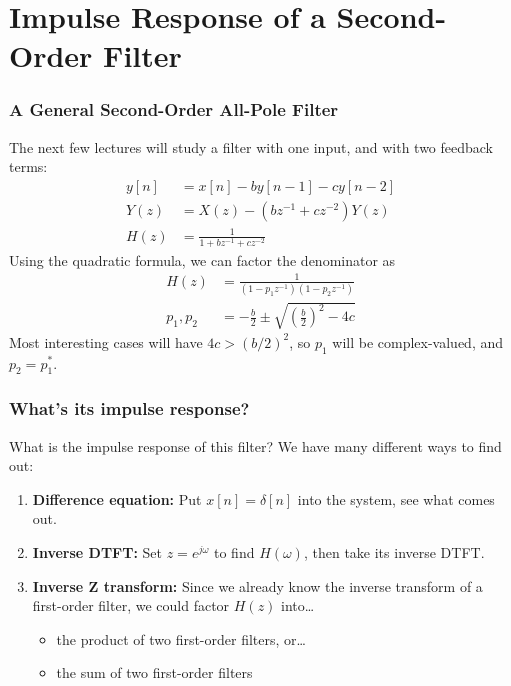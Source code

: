 \documentclass{beamer}
\begin{document}
\section[Second-Order]{Impulse Response of a Second-Order Filter}
\setcounter{subsection}{1}

\begin{frame}
  \frametitle{A General Second-Order All-Pole Filter}

  The next few lectures will study a filter with one input, and with
  two feedback terms:
  \begin{align*}
    y[n] &= x[n]-by[n-1]-cy[n-2]\\
    Y(z) &= X(z)-(bz^{-1}+cz^{-2})Y(z)\\
    H(z) &= \frac{1}{1+bz^{-1}+cz^{-2}}
  \end{align*}
  Using the quadratic formula, we can factor the denominator as
  \begin{align*}
    H(z) &= \frac{1}{(1-p_1z^{-1})(1-p_2z^{-1})}\\
    p_1,p_2 &= -\frac{b}{2}\pm\sqrt{\left(\frac{b}{2}\right)^2-4c}
  \end{align*}
  Most interesting cases will have $4c>(b/2)^2$, so $p_1$ will be
  complex-valued, and $p_2=p_1^*$.
\end{frame}

\begin{frame}
  \frametitle{What's its impulse response?}

  What is the impulse response of this filter?  We have many different
  ways to find out:
  \begin{enumerate}
  \item \textbf{Difference equation:} Put $x[n]=\delta[n]$
    into the system, see what comes out.
  \item \textbf{Inverse DTFT:} Set $z=e^{j\omega}$ to find
    $H(\omega)$, then take its inverse DTFT.
  \item \textbf{Inverse Z transform:} Since we already know the
    inverse transform of a first-order filter, we could factor $H(z)$
    into\ldots
    \begin{itemize}
    \item the product of two first-order filters, or\ldots
    \item the sum of two first-order filters
    \end{itemize}
  \end{enumerate}
\end{frame}
\end{document}
